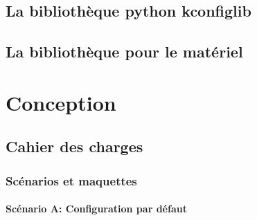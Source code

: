 \documentclass[16pts]{report}
\begin{document}
    \section{La bibliothèque python kconfiglib}
    \label{sec:La bibliothèque python kconfiglib}

    \section{La bibliothèque pour le matériel}
    \label{sec:La bibliothèque pour le matériel}

\chapter{Conception}
\label{cha:Conception}
    \section{Cahier des charges}
    \label{sec:Cahier des charges}
        \subsection{Scénarios et maquettes}
        \label{sub:Scénarios et maquettes}

\subsubsection{Scénario A: Configuration par défaut}
\label{sssub:Scénario A: Configuration par défaut}
\end{document}
